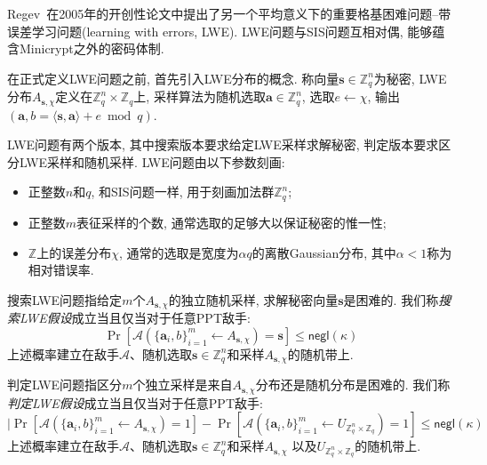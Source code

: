 Regev~\cite{Regev-STOC-2005}在2005年的开创性论文中提出了另一个平均意义下的重要格基困难问题--带误差学习问题(learning with errors, LWE). 
LWE问题与SIS问题互相对偶, 能够蕴含Minicrypt之外的密码体制. 

在正式定义LWE问题之前, 首先引入LWE分布的概念. 称向量$\mathbf{s} \in \mathbb{Z}_q^n$为秘密, 
LWE分布$A_{\mathbf{s}, \chi}$定义在$\mathbb{Z}_q^n \times \mathbb{Z}_q$上, 
采样算法为随机选取$\mathbf{a} \in \mathbb{Z}_q^n$, 选取$e \leftarrow \chi$, 
输出$(\mathbf{a}, b = \langle \mathbf{s}, \mathbf{a}\rangle+e \bmod q)$. 

LWE问题有两个版本, 其中搜索版本要求给定LWE采样求解秘密, 判定版本要求区分LWE采样和随机采样. 
LWE问题由以下参数刻画: 
\begin{itemize}
\item 正整数$n$和$q$, 和SIS问题一样, 用于刻画加法群$\mathbb{Z}_q^n$;
\item 正整数$m$表征采样的个数, 通常选取的足够大以保证秘密的惟一性; 
\item $\mathbb{Z}$上的误差分布$\chi$, 通常的选取是宽度为$\alpha q$的离散Gaussian分布, 其中$\alpha < 1$称为相对错误率. 
\end{itemize} 

\begin{definition}[搜索LWE假设]
搜索LWE问题指给定$m$个$A_{\mathbf{s}, \chi}$的独立随机采样, 求解秘密向量$\mathbf{s}$是困难的. 
我们称\emph{搜索LWE假设}成立当且仅当对于任意PPT敌手:
\begin{equation*}
\Pr[\mathcal{A}(\{\mathbf{a}_i, b\}_{i=1}^m \leftarrow A_{\mathbf{s}, \chi}) = \mathbf{s}] \leq \mathsf{negl}(\kappa) 
\end{equation*} 
上述概率建立在敌手$\mathcal{A}$、随机选取$\mathbf{s} \in \mathbb{Z}_q^n$和采样$A_{\mathbf{s}, \chi}$的随机带上. 
\end{definition}

\begin{definition}[判定LWE假设]
判定LWE问题指区分$m$个独立采样是来自$A_{\mathbf{s}, \chi}$分布还是随机分布是困难的. 
我们称\emph{判定LWE假设}成立当且仅当对于任意PPT敌手:
\begin{equation*}
|\Pr[\mathcal{A}(\{\mathbf{a}_i, b\}_{i=1}^m \leftarrow A_{\mathbf{s}, \chi}) = 1] - 
 \Pr[\mathcal{A}(\{\mathbf{a}_i, b\}_{i=1}^m \leftarrow U_{\mathbb{Z}_q^n \times \mathbb{Z}_q}) = 1] \leq \mathsf{negl}(\kappa) 
\end{equation*} 
上述概率建立在敌手$\mathcal{A}$、随机选取$\mathbf{s} \in \mathbb{Z}_q^n$和采样$A_{\mathbf{s}, \chi}$
以及$U_{\mathbb{Z}_q^n \times \mathbb{Z}_q}$的随机带上. 
\end{definition}

